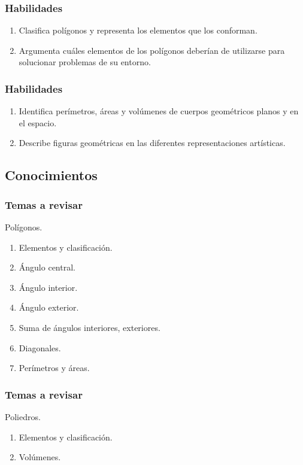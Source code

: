 \documentclass[14pt]{beamer}
\begin{document}
\begin{frame}
\frametitle{Habilidades}
\begin{enumerate}[<+->]
\item Clasifica polígonos y representa los elementos que los conforman.
\item Argumenta cuáles elementos de los polígonos deberían de utilizarse para solucionar problemas de su entorno.
\seti
\end{enumerate}
\end{frame}
\begin{frame}
\frametitle{Habilidades}
\begin{enumerate}[<+->]
\conti
\item Identifica perímetros, áreas y volúmenes de cuerpos geométricos planos y en el espacio.
\item Describe figuras geométricas en las diferentes representaciones artísticas.
\end{enumerate}
\end{frame}

\subsection{Conocimientos}

\begin{frame}
\frametitle{Temas a revisar}
Polígonos.
\pause
{}
\begin{enumerate}[<+->]
\item Elementos y clasificación.
\item Ángulo central.
\item Ángulo interior.
\item Ángulo exterior.
\item Suma de ángulos interiores, exteriores.
\item Diagonales.
\item Perímetros y áreas.
\end{enumerate}
\end{frame}
\begin{frame}
\frametitle{Temas a revisar}
Poliedros.
\pause
{}
\begin{enumerate}[<+->]
\item Elementos y clasificación.
\item Volúmenes.
\end{enumerate}
\end{frame}
\end{document}
